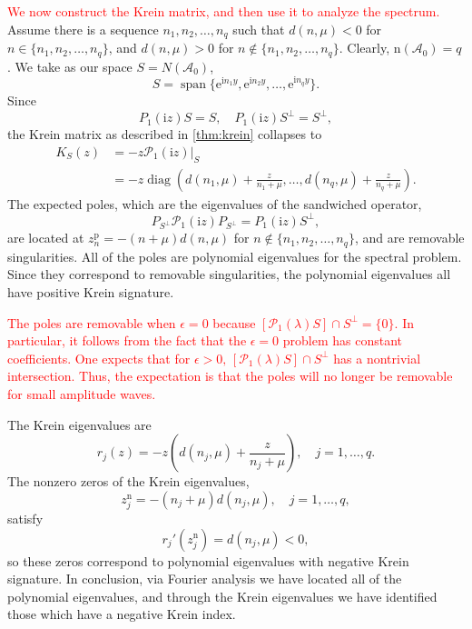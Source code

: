 \documentclass[review,onefignum,onetabnum]{siamart171218}
\def\diag{\mathop\mathrm{diag}\nolimits}
\def\Span{\mathop\mathrm{span}\nolimits}
\newcommand{\rme}{\mathrm{e}}
\newcommand{\rmi}{\mathrm{i}}
\newcommand{\rmn}{\mathrm{n}}
\newcommand{\rmp}{\mathrm{p}}
\newcommand{\calA}{\mathcal{A}}
\newcommand{\calP}{\mathcal{P}}
\newcommand{\vK}{\bm{\mathit{K}}}
\newcommand{\revised}[1]{ \textcolor{red}{#1} }
\begin{document}
\revised{
We now construct the Krein matrix, and then use it to analyze the spectrum.
}
Assume there is a sequence
$n_1,n_2,\dots,n_q$ such that $d(n,\mu)<0$ for $n\in\{n_1,n_2,\dots,n_q\}$,
and $d(n,\mu)>0$ for $n\notin\{n_1,n_2,\dots,n_q\}$. Clearly,
$\rmn(\calA_0)=q$. We take as our space $S=N(\calA_0)$,
\[
S=\Span\{\rme^{\rmi n_1y},\rme^{\rmi n_2 y},\dots,\rme^{\rmi n_q y}\}.
\]
Since
\[
P_1(\rmi z)S=S,\quad P_1(\rmi z)S^\perp=S^\perp,
\]
the Krein matrix as described in \cref{thm:krein} collapses to
\[
\begin{aligned}
\vK_S(z)&=-z\calP_1(\rmi z)|_S\\
&=-z\diag\left(d(n_1,\mu)+\frac{z}{n_1+\mu},\dots,d(n_q,\mu)+\frac{z}{n_q+\mu}\right).
\end{aligned}
\]
The expected poles, which are the eigenvalues of the sandwiched operator,
\[
P_{S^\perp}\calP_1(\rmi z)P_{S^\perp}=P_1(\rmi z)S^\perp,
\]
are located at
$z_n^\rmp=-(n+\mu)d(n,\mu)$ for $n\notin\{n_1,n_2,\dots,n_q\}$, and are
removable singularities. All of the poles are polynomial eigenvalues for the spectral
problem. Since they correspond to removable singularities, the polynomial
eigenvalues all have positive Krein signature.

\revised{
\begin{remark}
The poles are removable when $\epsilon=0$ because  $[\calP_1(\lambda)S]\cap S^\perp=\{0\}$. In particular, it follows from the fact that the $\epsilon=0$ problem has constant coefficients.  One expects that for $\epsilon>0,\,[\calP_1(\lambda)S]\cap S^\perp$ has a nontrivial intersection. Thus, the expectation is that the poles will no longer be removable for small amplitude waves.
\end{remark}
}

The Krein eigenvalues are
\[
r_j(z)=-z\left(d(n_j,\mu)+\frac{z}{n_j+\mu}\right),\quad j=1,\dots,q.
\]
The nonzero zeros of the Krein eigenvalues,
\[
z_j^\rmn=-(n_j+\mu)d(n_j,\mu),\quad j=1,\dots,q,
\]
satisfy
\[
r_j'(z_j^\rmn)=d(n_j,\mu)<0,
\]
so these zeros correspond to polynomial eigenvalues with negative Krein
signature. In conclusion, via Fourier analysis we have located all of the polynomial eigenvalues, and through the Krein eigenvalues we have identified those which have a negative Krein index.
\end{document}
